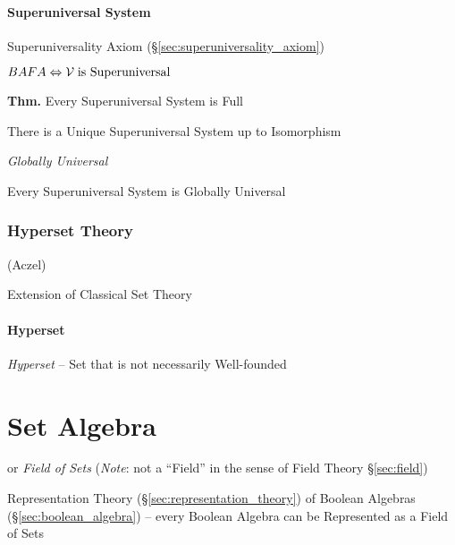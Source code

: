\paragraph{Superuniversal System}\label{sec:superuniversal_system}
\hfill

Superuniversality Axiom (\S\ref{sec:superuniversality_axiom})

$BAFA \Leftrightarrow \mathcal{V} \;\text{is Superuniversal}$

\textbf{Thm.} Every Superuniversal System is Full

There is a Unique Superuniversal System up to Isomorphism

\emph{Globally Universal}

Every Superuniversal System is Globally Universal



\subsubsection{Hyperset Theory}\label{sec:hyperset_theory}

(Aczel)

Extension of Classical Set Theory




\paragraph{Hyperset}\label{sec:hyperset}\hfill

\emph{Hyperset} -- Set that is not necessarily Well-founded



\section{Set Algebra}\label{sec:set_algebra}

or \emph{Field of Sets} (\emph{Note}: not a ``Field'' in the sense of Field
Theory \S\ref{sec:field})

Representation Theory (\S\ref{sec:representation_theory}) of Boolean Algebras
(\S\ref{sec:boolean_algebra}) -- every Boolean Algebra can be Represented as a
Field of Sets

